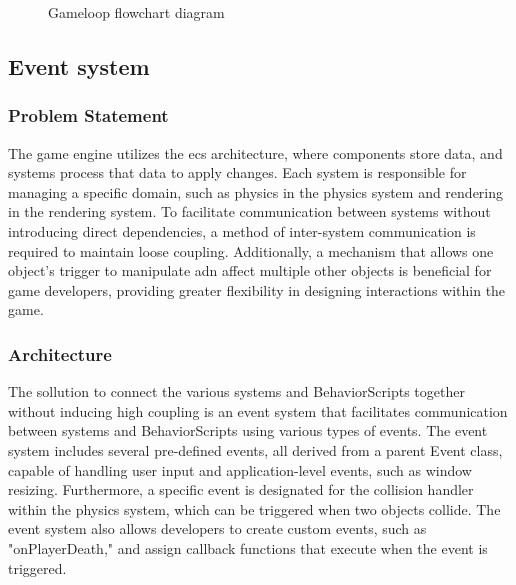 \documentclass{projdoc}
\begin{document}
\begin{figure}
	\centering
	\caption{Gameloop flowchart diagram}
	\label{fig:gameloop-class}
\end{figure}

\subsection{Event system}

\subsubsection{Problem Statement}

The game engine utilizes the \gls{ecs} architecture, where components store data, and
systems process that data to apply changes. Each system is responsible for managing a
specific domain, such as physics in the physics system and rendering in the rendering
system. To facilitate communication between systems without introducing direct
dependencies, a method of inter-system communication is required to maintain loose
coupling. Additionally, a mechanism that allows one object's trigger to manipulate
adn affect multiple other objects is beneficial for game developers, providing
greater flexibility in designing interactions within the game.

\subsubsection{Architecture}

The sollution to connect the various systems and BehaviorScripts together without
inducing high coupling is an event system that facilitates communication between
systems and BehaviorScripts using various types of events. The event system includes
several pre-defined events, all derived from a parent Event class, capable of
handling user input and application-level events, such as window resizing.
Furthermore, a specific event is designated for the collision handler within the
physics system, which can be triggered when two objects collide. The event system
also allows developers to create custom events, such as "onPlayerDeath," and assign
callback functions that execute when the event is triggered.
\end{document}
